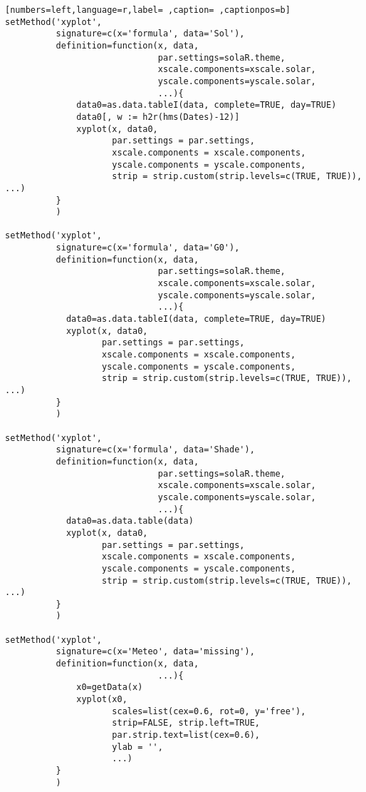 \begin{lstlisting}[numbers=left,language=r,label= ,caption= ,captionpos=b]
setMethod('xyplot',
          signature=c(x='formula', data='Sol'),
          definition=function(x, data,
                              par.settings=solaR.theme,
                              xscale.components=xscale.solar,
                              yscale.components=yscale.solar,
                              ...){
              data0=as.data.tableI(data, complete=TRUE, day=TRUE)
              data0[, w := h2r(hms(Dates)-12)]
              xyplot(x, data0,
                     par.settings = par.settings,
                     xscale.components = xscale.components,
                     yscale.components = yscale.components,
                     strip = strip.custom(strip.levels=c(TRUE, TRUE)), ...)
          }
          )

setMethod('xyplot',
          signature=c(x='formula', data='G0'),
          definition=function(x, data,
                              par.settings=solaR.theme,
                              xscale.components=xscale.solar,
                              yscale.components=yscale.solar,
                              ...){
            data0=as.data.tableI(data, complete=TRUE, day=TRUE)
            xyplot(x, data0,
                   par.settings = par.settings,
                   xscale.components = xscale.components,
                   yscale.components = yscale.components,
                   strip = strip.custom(strip.levels=c(TRUE, TRUE)), ...)
          }
          )

setMethod('xyplot',
          signature=c(x='formula', data='Shade'),
          definition=function(x, data,
                              par.settings=solaR.theme,
                              xscale.components=xscale.solar,
                              yscale.components=yscale.solar,
                              ...){
            data0=as.data.table(data)
            xyplot(x, data0,
                   par.settings = par.settings,
                   xscale.components = xscale.components,
                   yscale.components = yscale.components,
                   strip = strip.custom(strip.levels=c(TRUE, TRUE)), ...)
          }
          )

setMethod('xyplot',
          signature=c(x='Meteo', data='missing'),
          definition=function(x, data,
                              ...){
              x0=getData(x)
              xyplot(x0,
                     scales=list(cex=0.6, rot=0, y='free'),
                     strip=FALSE, strip.left=TRUE,
                     par.strip.text=list(cex=0.6),
                     ylab = '',
                     ...)
          }
          )


\end{lstlisting}
